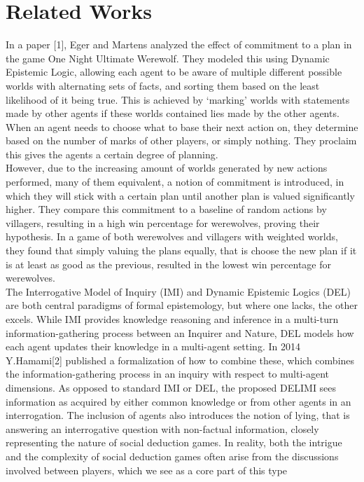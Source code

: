 \section{Related Works}
In a paper [1], Eger and Martens analyzed the effect of commitment to a plan in
the game One Night Ultimate Werewolf. They modeled this using Dynamic Epistemic
Logic, allowing each agent to be aware of multiple different possible worlds
with alternating sets of facts, and sorting them based on the least likelihood
of it being true. This is achieved by ‘marking’ worlds with statements made by
other agents if these worlds contained lies made by the other agents. When an
agent needs to choose what to base their next action on, they determine based
on the number of marks of other players, or simply nothing. They proclaim this
gives the agents a certain degree of planning. \\ However, due to the increasing
amount of worlds generated by new actions performed, many of them equivalent, a
notion of commitment is introduced, in which they will stick with a certain
plan until another plan is valued significantly higher. They compare this
commitment to a baseline of random actions by villagers, resulting in a high
win percentage for werewolves, proving their hypothesis. In a game of both
werewolves and villagers with weighted worlds, they found that simply valuing
the plans equally, that is choose the new plan if it is at least as good as the
previous, resulted in the lowest win percentage for werewolves. \\ The
Interrogative Model of Inquiry (IMI) and Dynamic Epistemic Logics (DEL) are
both central paradigms of formal epistemology, but where one lacks, the other
excels. While IMI provides knowledge reasoning and inference in a multi-turn
information-gathering process between an Inquirer and Nature, DEL models how
each agent updates their knowledge in a multi-agent setting. In 2014
Y.Hamami[2] published a formalization of how to combine these, which combines
the information-gathering process in an inquiry with respect to multi-agent
dimensions. As opposed to standard IMI or DEL, the proposed DELIMI sees
information as acquired by either common knowledge or from other agents in an
interrogation. The inclusion of agents also introduces the notion of lying,
that is answering an interrogative question with non-factual information,
closely representing the nature of social deduction games. In reality, both the
intrigue and the complexity of social deduction games often arise from the
discussions involved between players, which we see as a core part of this type
